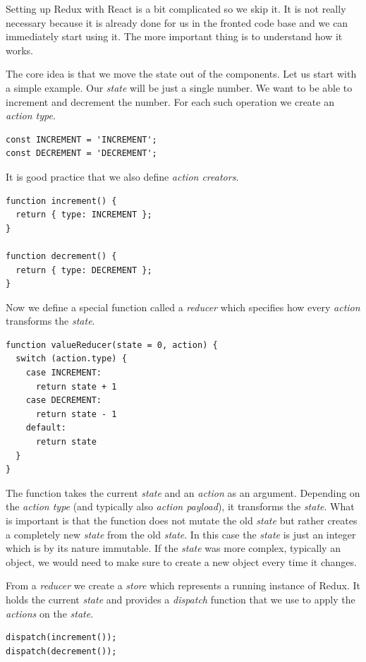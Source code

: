 Setting up Redux with React is a bit complicated so we skip it. It is not really necessary because it is already done for us in the fronted code base and we can immediately start using it. The more important thing is to understand how it works.

The core idea is that we move the state out of the components. Let us start with a simple example. Our \emph{state} will be just a single number. We want to be able to increment and decrement the number. For each such operation we create an \emph{action type}.

\begin{verbatim}
const INCREMENT = 'INCREMENT';
const DECREMENT = 'DECREMENT';
\end{verbatim}

It is good practice that we also define \emph{action creators}.

\begin{verbatim}
function increment() {
  return { type: INCREMENT };
}

function decrement() {
  return { type: DECREMENT };
}
\end{verbatim}

Now we define a special function called a \emph{reducer} which specifies how every \emph{action} transforms the \emph{state}.

\begin{verbatim}
function valueReducer(state = 0, action) {
  switch (action.type) {
    case INCREMENT:
      return state + 1
    case DECREMENT:
      return state - 1
    default:
      return state
  }
}
\end{verbatim}

The function takes the current \emph{state} and an \emph{action} as an argument. Depending on the \emph{action type} (and typically also \emph{action payload}), it transforms the \emph{state}. What is important is that the function does not mutate the old \emph{state} but rather creates a completely new \emph{state} from the old \emph{state}. In this case the \emph{state} is just an integer which is by its nature immutable. If the \emph{state} was more complex, typically an object, we would need to make sure to create a new object  every time it changes.

From a \emph{reducer} we create a \emph{store} which represents a running instance of Redux. It holds the current \emph{state} and provides a \emph{dispatch} function that we use to apply the \emph{actions} on the \emph{state}.

\begin{verbatim}
dispatch(increment());
dispatch(decrement());
\end{verbatim}

